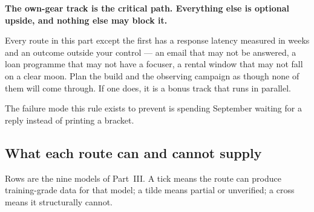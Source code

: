 \documentclass[11pt]{article}
\begin{document}
\begin{redbox}
\textbf{The own-gear track is the critical path. Everything else is optional
upside, and nothing else may block it.}

Every route in this part except the first has a response latency measured in
weeks and an outcome outside your control --- an email that may not be answered,
a loan programme that may not have a focuser, a rental window that may not fall
on a clear moon. Plan the build and the observing campaign as though none of
them will come through. If one does, it is a bonus track that runs in parallel.

The failure mode this rule exists to prevent is spending September waiting for a
reply instead of printing a bracket.
\end{redbox}

\subsection{What each route can and cannot supply}

Rows are the nine models of Part~III. A tick means the route can produce
training-grade data for that model; a tilde means partial or unverified; a cross
means it structurally cannot.
\end{document}
